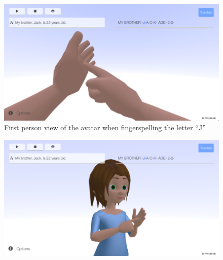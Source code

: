 \documentclass[12pt]{ociamthesis}  %
\begin{document}
\begin{figure}[h]
	\centering
    \includegraphics[scale=0.45]{appendix/fpv}
    \caption{First person view of the avatar when fingerspelling the letter ``J''}
    \label{fig:fpv}
\end{figure}
\begin{figure}[h]
	\centering
    \includegraphics[scale=0.45]{appendix/3rd}
    \label{fig:3rd}
\end{figure}
\end{document}
